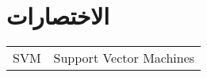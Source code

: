 

\chapter*{الاختصارات}

\begin{doublespacing}
	\begin{center}
		\begin{english}
			\begin{tabular}{l l}
				
				\indent
				SVM		&		Support Vector Machines \\
				
			\end{tabular}
		\end{english}
	\end{center}
\end{doublespacing}

